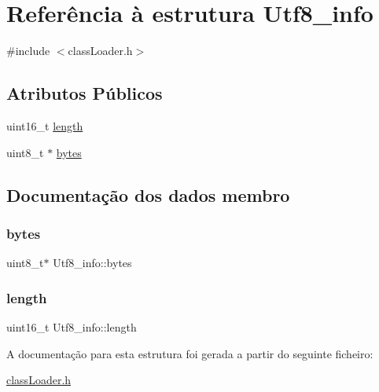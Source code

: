 \hypertarget{struct_utf8__info}{}\section{Referência à estrutura Utf8\+\_\+info}
\label{struct_utf8__info}


{\ttfamily \#include $<$class\+Loader.\+h$>$}

\subsection*{Atributos Públicos}
\begin{DoxyCompactItemize}
\item 
uint16\+\_\+t \hyperlink{struct_utf8__info_a8044eb3ec2d1a7025ee44159ace7eb05}{length}
\item 
uint8\+\_\+t $\ast$ \hyperlink{struct_utf8__info_ad3820d817cf98aac3674bf88f43140bd}{bytes}
\end{DoxyCompactItemize}


\subsection{Documentação dos dados membro}
\hypertarget{struct_utf8__info_ad3820d817cf98aac3674bf88f43140bd}{}\label{struct_utf8__info_ad3820d817cf98aac3674bf88f43140bd} 
\subsubsection{\texorpdfstring{bytes}{bytes}}
{\footnotesize\ttfamily uint8\+\_\+t$\ast$ Utf8\+\_\+info\+::bytes}

\hypertarget{struct_utf8__info_a8044eb3ec2d1a7025ee44159ace7eb05}{}\label{struct_utf8__info_a8044eb3ec2d1a7025ee44159ace7eb05} 
\subsubsection{\texorpdfstring{length}{length}}
{\footnotesize\ttfamily uint16\+\_\+t Utf8\+\_\+info\+::length}



A documentação para esta estrutura foi gerada a partir do seguinte ficheiro\+:\begin{DoxyCompactItemize}
\item 
\hyperlink{class_loader_8h}{class\+Loader.\+h}\end{DoxyCompactItemize}
